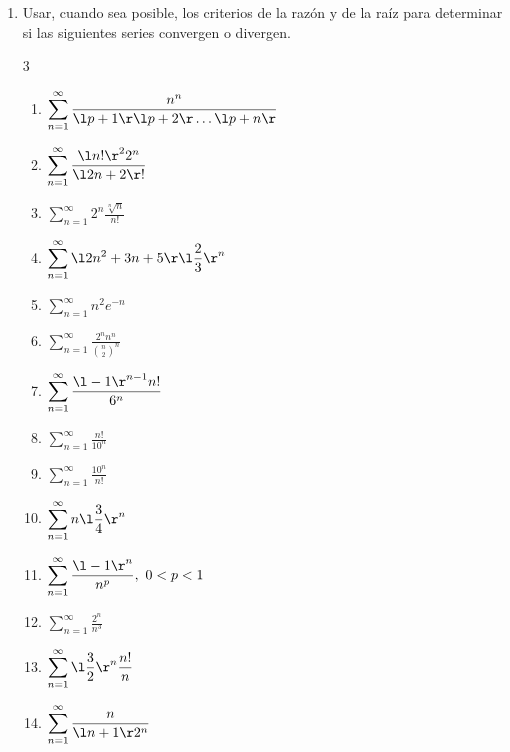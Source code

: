 \begin{enumerate}
\item Usar, cuando sea posible, los criterios de la razón y de la raíz para determinar si las siguientes series convergen o divergen.
\begin{multicols}{3}
\begin{enumerate}
\item $ \displaystyle{ \sum_{n=1}^{\infty}{ \frac{n^n}{\l p+1 \r \l p+2 \r \ldots \l p+n \r } } } $
\item $ \displaystyle{ \sum_{n=1}^{\infty}{ \frac{\l n! \r^2 2^n}{\l 2n+2 \r! } } } $
\item $ \displaystyle{ \sum_{n=1}^{\infty}{2^n \frac{\sqrt[n]{n}}{n! } } } $
\item $ \displaystyle{ \sum_{n=1}^{\infty}{ \l 2n^2 + 3n +5 \r \l \frac{2}{3 } \r^n } } $
\item $ \displaystyle{ \sum_{n=1}^{\infty}{ n^2 e^{-n} } } $
\item $ \displaystyle{ \sum_{n=1}^{\infty}{ \frac{2^n n^n}{ \binom{n}{2}^n } } } $
\item $ \displaystyle{ \sum_{n=1}^{\infty}{ \frac{\l -1 \r^{n-1} n!}{6^n } } } $
\item $ \displaystyle{ \sum_{n=1}^{\infty}{ \frac{n!}{10^n} } } $
\item $ \displaystyle{ \sum_{n=1}^{\infty}{ \frac{10^n}{n!} } } $
\item $ \displaystyle{ \sum_{n=1}^{\infty}{ n \l \frac{3}{4 } \r^n } } $
\item $ \displaystyle{ \sum_{n=1}^{\infty}{ \frac{\l -1 \r^n}{n^p } } }, \,\, 0 < p <1 $
\item $ \displaystyle{ \sum_{n=1}^{\infty}{ \frac{2^n}{n^3 } } } $
\item $ \displaystyle{ \sum_{n=1}^{\infty}{ \l \frac{3}{2} \r^n \frac{n!}{n} } } $
\item $ \displaystyle{ \sum_{n=1}^{\infty}{ \frac{n}{\l n+1 \r 2^n} } } $
\end{enumerate}
\end{multicols}


\end{enumerate}
